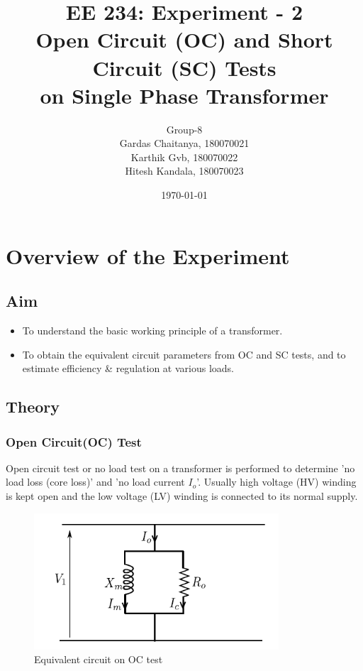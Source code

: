 \documentclass[12pt]{article}
\title{EE 234: Experiment - 2 \\
       Open Circuit (OC) and Short Circuit (SC) Tests\\ on Single
Phase Transformer}
\author{Group-8 \\Gardas Chaitanya, 180070021  \\
Karthik Gvb, 180070022 \\
Hitesh Kandala, 180070023}
\date{\today}
\begin{document}
  \maketitle
  
    \section{Overview of the Experiment}
        \subsection{Aim}
        \begin{itemize}
            \item To understand the basic working principle of a transformer.
            \item To obtain the equivalent circuit parameters from OC and SC tests, and to estimate efficiency & regulation at various loads.
        \end{itemize}
        \subsection{Theory}
        \subsubsection{Open Circuit(OC) Test}
            Open circuit test or no load test on a transformer is performed to determine 'no load loss (core loss)' and 'no load current $I_o$'. Usually high voltage (HV) winding is kept open and the low voltage (LV) winding is connected to its normal supply.
            \begin{figure}[H]
                \centering
                \includegraphics[width = 0.6\linewidth, height=2in]{LAB-2/OC_EQC.PNG}
                \caption{Equivalent circuit on OC test}
            \end{figure}
            
\end{document}
